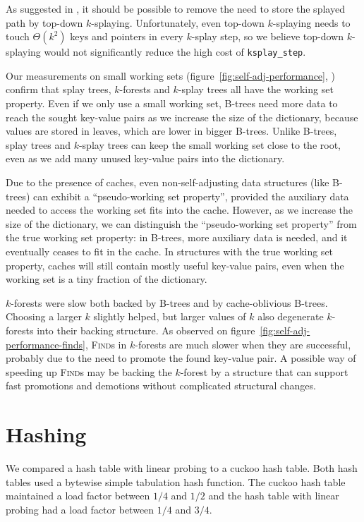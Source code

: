 As suggested in \cite{ksplay-sherk}, it should be possible to remove the
need to store the splayed path by top-down \mbox{$k$-splaying}.
Unfortunately, even top-down \mbox{$k$-splaying} needs to touch
$\Theta(k^2)$ keys and pointers in every $k$-splay step, so we believe top-down
\mbox{$k$-splaying} would not significantly reduce the high cost of
\texttt{ksplay\_step}.

Our measurements on small working sets
(figure~\ref{fig:self-adj-performance},
) confirm that splay trees, $k$-forests
and $k$-splay trees all have the working set property.
Even if we only use a small working set, B-trees need more data to reach
the sought key-value pairs as we increase the size of the dictionary, because
values are stored in leaves, which are lower in bigger B-trees.
Unlike B-trees, splay trees and $k$-splay trees can keep the small working set
close to the root, even as we add many unused key-value pairs into the
dictionary.

Due to the presence of caches, even non-self-adjusting data structures (like
\mbox{B-trees}) can exhibit a ``pseudo-working set property'', provided
the auxiliary data needed to access the working set fits into the cache.
However, as we increase the size of the dictionary, we can distinguish
the ``pseudo-working set property'' from the true working set property:
in B-trees, more auxiliary data is needed, and it eventually ceases to fit
in the cache.
In structures with the true working set property, caches will still contain
mostly useful key-value pairs, even when the working set is a tiny fraction
of the dictionary.

$k$-forests were slow both backed by B-trees and by cache-oblivious B-trees.
Choosing a larger $k$ slightly helped, but larger values of $k$ also degenerate
\mbox{$k$-forests} into their backing structure.
As observed on figure~\ref{fig:self-adj-performance-finds}, \textsc{Find}s in
$k$-forests are much slower when they are successful, probably due to the need
to promote the found key-value pair. A possible way of speeding up
\textsc{Find}s may be backing the \mbox{$k$-forest} by a structure that can
support fast promotions and demotions without complicated structural changes.

\section{Hashing}
\label{sec:hashing-results}
We compared a hash table with linear probing to a cuckoo hash table.
Both hash tables used a bytewise simple tabulation hash function.
The cuckoo hash table maintained a load factor between $1/4$ and
$1/2$ and the hash table with linear probing had a load factor
between $1/4$ and $3/4$.

